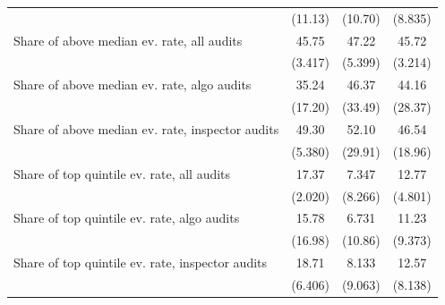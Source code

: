 {\begin{tabular}{l*{3}{c}}
            &     (11.13)         &     (10.70)         &     (8.835)         \\
Share of above median ev. rate, all audits&       45.75         &       47.22         &       45.72         \\
            &     (3.417)         &     (5.399)         &     (3.214)         \\
Share of above median ev. rate, algo audits&       35.24         &       46.37         &       44.16         \\
            &     (17.20)         &     (33.49)         &     (28.37)         \\
Share of above median ev. rate, inspector audits&       49.30         &       52.10         &       46.54         \\
            &     (5.380)         &     (29.91)         &     (18.96)         \\
Share of top quintile ev. rate, all audits&       17.37         &       7.347         &       12.77         \\
            &     (2.020)         &     (8.266)         &     (4.801)         \\
Share of top quintile ev. rate, algo audits&       15.78         &       6.731         &       11.23         \\
            &     (16.98)         &     (10.86)         &     (9.373)         \\
Share of top quintile ev. rate, inspector audits&       18.71         &       8.133         &       12.57         \\
            &     (6.406)         &     (9.063)         &     (8.138)         \\
\bottomrule
\end{tabular}
}
